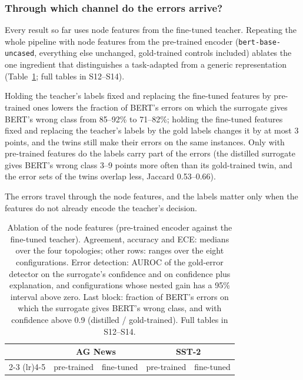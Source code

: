 \subsubsection{Through which channel do the errors arrive?} \label{sec:inherit_channel}
Every result so far uses node features from the fine-tuned teacher. Repeating the whole pipeline with node features from the pre-trained encoder (\texttt{bert-base-uncased}, everything else unchanged, gold-trained controls included) ablates the one ingredient that distinguishes a task-adapted from a generic representation (Table~\ref{tab:ablation}; full tables in S12--S14).

Holding the teacher's labels fixed and replacing the fine-tuned features by pre-trained ones lowers the fraction of BERT's errors on which the surrogate gives BERT's wrong class from 85--92\% to 71--82\%; holding the fine-tuned features fixed and replacing the teacher's labels by the gold labels changes it by at most 3 points, and the twins still make their errors on the same instances. Only with pre-trained features do the labels carry part of the errors (the distilled surrogate gives BERT's wrong class 3--9 points more often than its gold-trained twin, and the error sets of the twins overlap less, Jaccard 0.53--0.66).

The errors travel through the node features, and the labels matter only when the features do not already encode the teacher's decision.

\begin{table}[H]
\centering
\scriptsize
\setlength{\tabcolsep}{3pt}
\caption{Ablation of the node features (pre-trained encoder against the fine-tuned teacher). Agreement, accuracy and ECE: medians over the four topologies; other rows: ranges over the eight configurations. Error detection: AUROC of the gold-error detector on the surrogate's confidence and on confidence plus explanation, and configurations whose nested gain has a 95\% interval above zero. Last block: fraction of BERT's errors on which the surrogate gives BERT's wrong class, and with confidence above 0.9 (distilled / gold-trained). Full tables in S12--S14.}
\label{tab:ablation}
\begin{tabular}{@{}lcccc@{}}
\toprule
& \multicolumn{2}{c}{\textbf{AG News}} & \multicolumn{2}{c}{\textbf{SST-2}} \\
\cmidrule(lr){2-3} \cmidrule(lr){4-5}
& pre-trained & fine-tuned & pre-trained & fine-tuned \\
\midrule

\end{tabular}
\end{table}

